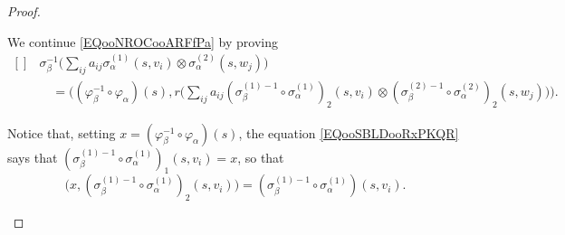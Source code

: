 \begin{proof}
\begin{subproof}
\begin{subproof}
			We continue \eqref{EQooNROCooARFfPa} by proving
			\begin{equation}		\label{EQooGVGEooRbGZUd}
				\begin{aligned}[]
					 & \sigma_{\beta}^{-1}\Big( \sum_{ij}a_{ij}\sigma_{\alpha}^{(1)}(s,v_i)\otimes \sigma_{\alpha}^{(2)}(s,w_j) \Big)                                  \\
					 & \quad = \Big( (\varphi_{\beta}^{-1}\circ\varphi_{\alpha})(s),r\big( \sum_{ij}a_{ij}(\sigma_{\beta}^{(1)-1}\circ \sigma_{\alpha}^{(1)})_2(s,v_i)
					\otimes
					(\sigma_{\beta}^{(2)-1}\circ\sigma_{\alpha}^{(2)})_2(s,w_j)
					\big) \Big).
				\end{aligned}
			\end{equation}

			Notice that, setting \( x=(\varphi_{\beta}^{-1}\circ\varphi_{\alpha})(s)\), the equation \eqref{EQooSBLDooRxPKQR} says that \(   (\sigma_{\beta}^{(1)-1}\circ\sigma_{\alpha}^{(1)})_1(s,v_i)  =x   \), so that
			\begin{equation}		\label{EQooZEBYooXtCaUP}
				\big( x,  (\sigma_{\beta}^{(1)-1}\circ\sigma_{\alpha}^{(1)})_2(s,v_i) \big) = (\sigma_{\beta}^{(1)-1}\circ\sigma_{\alpha}^{(1)})(s,v_i).
			\end{equation}


\end{subproof}
\end{subproof}
\end{proof}
